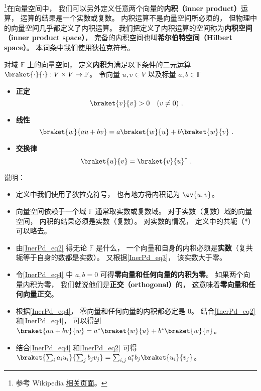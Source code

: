 

\footnote{参考 Wikipedia \href{https://en.wikipedia.org/wiki/Inner_product_space}{相关页面}。}在向量空间中， 我们可以另外定义任意两个向量的\textbf{内积（inner product）}运算， 运算的结果是一个实数或复数。 内积运算不是向量空间所必须的， 但物理中的向量空间几乎都定义了内积运算。 我们把定义了内积运算的空间称为\textbf{内积空间（inner product space）}， 完备的内积空间也叫\textbf{希尔伯特空间（Hilbert space）}。 本词条中我们使用狄拉克符号。

\begin{definition}{}
对域 $\mathbb F$ 上的向量空间， 定义\textbf{内积}为满足以下条件的二元运算 $\braket{\cdot}{\cdot}: V\times V\to \mathbb F$。 令向量 $u, v\in V$ 以及标量 $a, b \in \mathbb F$
\begin{itemize}
\item \textbf{正定}
\begin{equation}\label{InerPd_eq3}
\braket{v}{v} > 0 \quad (v \ne 0)~.
\end{equation}
\item \textbf{线性}
\begin{equation}\label{InerPd_eq4}
\braket{w}{a u + b v} = a\braket{w}{u} + b\braket{w}{v}~.
\end{equation}
\item \textbf{交换律}
\begin{equation}\label{InerPd_eq2}
\braket{u}{v} = \braket{v}{u}^*~.
\end{equation}
\end{itemize}
\end{definition}
说明：
\begin{itemize}
\item 定义中我们使用了狄拉克符号， 也有地方将内积记为 $\ev{u, v}$。
\item 向量空间依赖于一个域 $\mathbb F$ 通常取实数或复数域。 对于实数（复数）域的向量空间， 内积的结果必须是实数（复数）。 对实数的情况， 定义中的共轭（*）可以略去。
\item 由\autoref{InerPd_eq2}  得无论 $\mathbb F$ 是什么， 一个向量和自身的内积必须是\textbf{实数}（复共轭等于自身的数都是实数）。 又根据\autoref{InerPd_eq3}， 该实数大于零。
\item 令\autoref{InerPd_eq4} 中 $a,b= 0$ 可得\textbf{零向量和任何向量的内积为零}。 如果两个向量内积为零， 我们就说他们是\textbf{正交（orthogonal）}的， 这意味着\textbf{零向量和任何向量正交}。
\item 根据\autoref{InerPd_eq4}， 零向量和任何向量的内积都必定是 0。 结合\autoref{InerPd_eq2} 和\autoref{InerPd_eq4}， 可以得到 $\braket{a u + b v}{w} = a^*\braket{w}{u} + b^*\braket{w}{v}$。
\item 结合\autoref{InerPd_eq4} 和\autoref{InerPd_eq2} 可得 $\braket{\sum_i a_i u_i}{\sum_j b_j v_j} = \sum_{i,j} a_i^* b_j \braket{u_i}{v_j}$。
\end{itemize}

